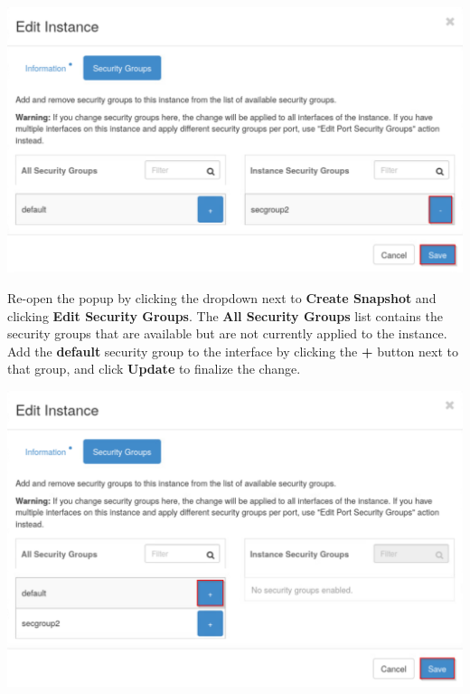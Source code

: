 \documentclass[letterpaper, 12pt]{article}
\begin{document}
\begin{enumerate}
\begin{labstep}
        \begin{center}
            \includegraphics[width=\linewidth]{images/part6/step19.png}
        \end{center}
    \end{labstep}

    \begin{labstep}
        Re-open the popup by clicking the dropdown next to \textbf{Create Snapshot} and clicking \textbf{Edit Security Groups}.
        The \textbf{All Security Groups} list contains the security groups that are available but are not currently applied to the instance.
        Add the \textbf{default} security group to the interface by clicking the \textbf{+} button next to that group, and click \textbf{Update} to finalize the change.

        \begin{center}
            \includegraphics[width=\linewidth]{images/part6/step20.png}
        \end{center}
    \end{labstep}


\end{enumerate}
\end{document}
